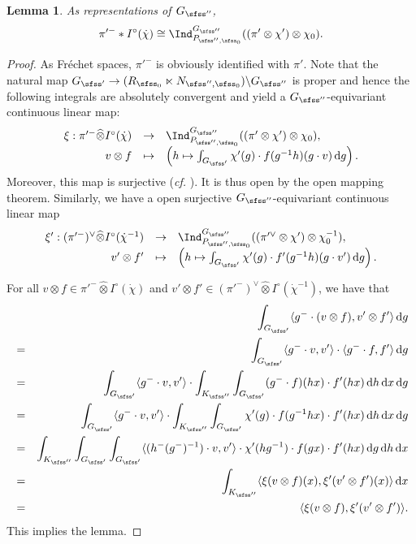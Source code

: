 \documentclass[12pt,a4paper]{amsart}
\newcommand{\od}{\operatorname{d}}
\newcommand{\la}{\langle}
\newcommand{\ra}{\rangle}
\numberwithin{equation}{section}
\newtheorem{lem}[thm]{Lemma}
\theoremstyle{remark}
\def\cf{\emph{cf.} }
\begin{document}
\begin{lem}\label{isoipi}
 As representations of $G_{\sfss''}$,
 \[
   \pi'^-*I^\circ (\dot \chi)\cong \Ind_{P_{\sfss'',\sfss_0}}^{G_{\sfss''}} ((\pi'\otimes  \chi')\otimes \chi_0).
   \]
\end{lem}
\begin{proof}
As Fr\'echet spaces, $\pi'^-$ is obviously identified with $\pi'$.
Note that the natural map $G_{\sfss'}\rightarrow (R_{\sfss_0}\ltimes N_{\sfss'', \sfss_0})\backslash G_{\sfss''}$ is proper and hence the following integrals are absolutely convergent and yield a $G_{\sfss''}$-equivariant continuous linear map:
\[
\begin{array}{rcl}
\xi:   \pi'^-\widehat \otimes I^\circ (\dot \chi)&\rightarrow & \Ind_{P_{\sfss'',\sfss_0}}^{G_{\sfss''}} ((\pi'\otimes \chi')\otimes \chi_0),\\
   v\otimes f &\mapsto  & \left(h\mapsto\int_{G_{\sfss'}}\chi'(g)\cdot  f(g^{-1}h)(g\cdot v)\od\! g\right).
   \end{array}
\]
Moreover, this map is surjective (\cf \cite[Section 6.2]{CS21}). It is thus open by the open mapping theorem. Similarly, we have a open surjective
$G_{\sfss''}$-equivariant  continuous linear map
\[
\begin{array}{rcl}
\xi':   (\pi'^-)^\vee\widehat \otimes I^\circ (\dot \chi^{-1})&\rightarrow & \Ind_{P_{\sfss'',\sfss_0}}^{G_{\sfss''}} ((\pi'^\vee\otimes \chi')\otimes \chi_0^{-1}),\\
   v'\otimes f' &\mapsto  & \left(h\mapsto\int_{G_{\sfss'}} \chi'(g)\cdot  f'(g^{-1}h)(g\cdot v')\od\! g\right).
   \end{array}
\]

For all $v\otimes f \in \pi'^-\widehat \otimes I^\circ (\dot \chi)$ and $v'\otimes f' \in (\pi'^-)^\vee \widehat \otimes I^\circ (\dot \chi^{-1})$, we have that
\begin{eqnarray*}
 && \int_{G_{\sfss'}}\la g^-\cdot (v\otimes f), v'\otimes f'\ra \od\! g\\
 &=& \int_{G_{\sfss'}}\la g^-\cdot v, v'\ra \cdot \la g^-\cdot f, f'\ra \od\! g\\
 &=& \int_{G_{\sfss'}}\la g^-\cdot v, v'\ra \cdot \int_{K_{\sfss''}} \int_{G_{\sfss'}}   (g^-\cdot f)(hx) \cdot  f'(hx)  \od\! h \od \! x \od \! g\\
 &=& \int_{G_{\sfss'}}\la g^-\cdot v, v'\ra \cdot \int_{K_{\sfss''}} \int_{G_{\sfss'}}  \chi'(g) \cdot f(g^{-1}h x) \cdot  f'(hx)  \od\! h \od \! x \od \! g\\
  &=& \int_{K_{\sfss''}}  \int_{G_{\sfss'}}  \int_{G_{\sfss'}} \la (h^- (g^-)^{-1})\cdot v, v'\ra \cdot \chi'(hg^{-1}) \cdot f(gx) \cdot  f'(hx)  \od\! g \od \! h \od \! x \\
 &=&  \int_{K_{\sfss''}}\la  \xi(v\otimes f)(x),\xi'(v'\otimes f')(x)\ra  \od \! x\\
 &=& \la  \xi(v\otimes f),\xi'(v'\otimes f')\ra.
\end{eqnarray*}
This implies the lemma.
\end{proof}
\end{document}

